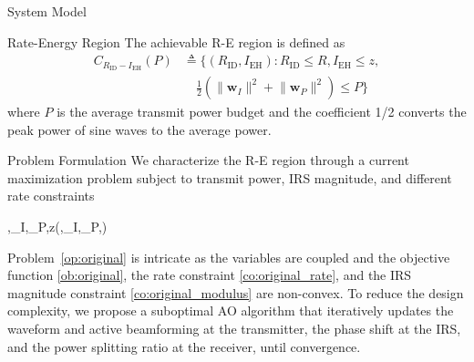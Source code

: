 \documentclass[journal]{IEEEtran}
\begin{document}
\begin{section}{System Model}
		\begin{subsection}{Rate-Energy Region}
			The achievable R-E region is defined as
			\begin{align}
				C_{R_{\text{ID}}-I_{\text{EH}}}(P)
				&\triangleq \biggl\{(R_{\text{ID}}, I_{\text{EH}}): R_{\text{ID}} \le R, I_{\text{EH}} \le z,\nonumber\\
				&\quad \frac{1}{2}\left(\lVert{\boldsymbol{w}_I}\rVert^2+\lVert{\boldsymbol{w}_P}\rVert^2\right) \le P\biggr\}
			\end{align}
			where $P$ is the average transmit power budget and the coefficient \num{1/2} converts the peak power of sine waves to the average power.
		\end{subsection}
	\end{section}


	\begin{section}{Problem Formulation}\label{se:problem_formulation}
		We characterize the R-E region through a current maximization problem subject to transmit power, IRS magnitude, and different rate constraints
		\begin{maxi!}
			{\boldsymbol{\phi},\boldsymbol{w}_I,_P,\rho}{z(\boldsymbol{\phi},\boldsymbol{w}_I,_P,\rho)}{\label{op:original}}{\label{ob:original}}
			\label{co:original_power}
			\label{co:original_rate}
			\label{co:original_modulus}
		\end{maxi!}
		Problem~\ref{op:original} is intricate as the variables are coupled and the objective function \ref{ob:original}, the rate constraint \ref{co:original_rate}, and the IRS magnitude constraint \ref{co:original_modulus} are non-convex. To reduce the design complexity, we propose a suboptimal AO algorithm that iteratively updates the waveform and active beamforming at the transmitter, the phase shift at the IRS, and the power splitting ratio at the receiver, until convergence.



\end{section}
\end{document}
